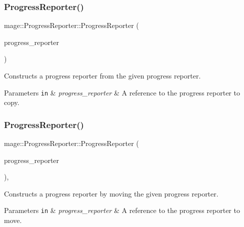 \subsubsection{\texorpdfstring{Progress\+Reporter()}{ProgressReporter()}\hspace{0.1cm}{\footnotesize\ttfamily [2/3]}}
{\footnotesize\ttfamily mage\+::\+Progress\+Reporter\+::\+Progress\+Reporter (\begin{DoxyParamCaption}\item[{const \hyperlink{classmage_1_1_progress_reporter}{Progress\+Reporter} \&}]{progress\+\_\+reporter }\end{DoxyParamCaption})\hspace{0.3cm}{\ttfamily [delete]}}

Constructs a progress reporter from the given progress reporter.


\begin{DoxyParams}[1]{Parameters}
\mbox{\tt in}  & {\em progress\+\_\+reporter} & A reference to the progress reporter to copy. \\
\hline
\end{DoxyParams}
\hypertarget{classmage_1_1_progress_reporter_ab36c4cf6e03bfa90ea07d64c74726ec9}{}\label{classmage_1_1_progress_reporter_ab36c4cf6e03bfa90ea07d64c74726ec9} 
\subsubsection{\texorpdfstring{Progress\+Reporter()}{ProgressReporter()}\hspace{0.1cm}{\footnotesize\ttfamily [3/3]}}
{\footnotesize\ttfamily mage\+::\+Progress\+Reporter\+::\+Progress\+Reporter (\begin{DoxyParamCaption}\item[{\hyperlink{classmage_1_1_progress_reporter}{Progress\+Reporter} \&\&}]{progress\+\_\+reporter }\end{DoxyParamCaption})\hspace{0.3cm}{\ttfamily [default]}, {\ttfamily [noexcept]}}

Constructs a progress reporter by moving the given progress reporter.


\begin{DoxyParams}[1]{Parameters}
\mbox{\tt in}  & {\em progress\+\_\+reporter} & A reference to the progress reporter to move. \\
\hline
\end{DoxyParams}
\hypertarget{classmage_1_1_progress_reporter_aa543239c6dd4474a77cf4cf6904c1b26}{}\label{classmage_1_1_progress_reporter_aa543239c6dd4474a77cf4cf6904c1b26} 
